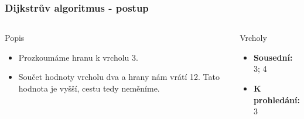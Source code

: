 \documentclass{beamer}
\begin{document}
\begin{frame}
    \frametitle{Dijkstrův algoritmus - postup}
    \begin{columns}
        \begin{block}{Popis}
            \begin{itemize}
                \item Prozkoumáme hranu k vrcholu 3.
                \item Součet hodnoty vrcholu dva a hrany nám vrátí 12. Tato hodnota je vyšší, cestu tedy neměníme.
            \end{itemize}
        \end{block}
        \begin{block}{Vrcholy}
            \begin{itemize}
                \item \textbf{Sousední:} 3; 4 
                \item \textbf{K prohledání:} 3
            \end{itemize}
        \end{block}
    \end{columns}
\end{frame}
\end{document}
